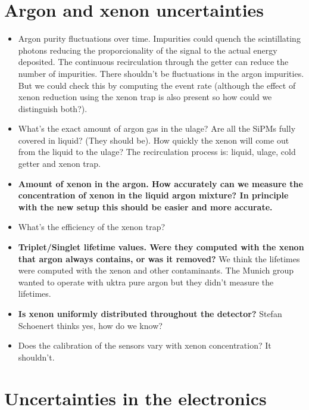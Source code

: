 \documentclass[11pt,a4paper,english,oneside, pdf]{article}
\begin{document}
	\section{Argon and xenon uncertainties}
	
	\begin{itemize}
		\item Argon purity fluctuations over time. Impurities could quench the scintillating photons reducing the proporcionality of the signal to the actual energy deposited. The continuous recirculation through the getter can reduce the number of impurities. There shouldn't be fluctuations in the argon impurities. But we could check this by computing the event rate (although the effect of xenon reduction using the xenon trap is also present so how could we distinguish both?).
		
		\item What's the exact amount of argon gas in the ulage? Are all the SiPMs fully covered in liquid? (They should be). How quickly the xenon will come out from the liquid to the ulage? The recirculation process is: liquid, ulage, cold getter and xenon trap.
		
		\item \textbf{Amount of xenon in the argon. How accurately can we measure the concentration of xenon in the liquid argon mixture? In principle with the new setup this should be easier and more accurate.}
		
		\item What's the efficiency of the xenon trap?
		
		\item \textbf{Triplet/Singlet lifetime values. Were they computed with the xenon that argon always contains, or was it removed?} We think the lifetimes were computed with the xenon and other contaminants. The Munich group wanted to operate with uktra pure argon but they didn't measure the lifetimes.
		
		\item \textbf{Is xenon uniformly distributed throughout the detector?} Stefan Schoenert thinks yes, how do we know?
		
		\item Does the calibration of the sensors vary with xenon concentration? It shouldn't.
		
	\end{itemize}
	
	
	\section{Uncertainties in the electronics}
	
\end{document}
